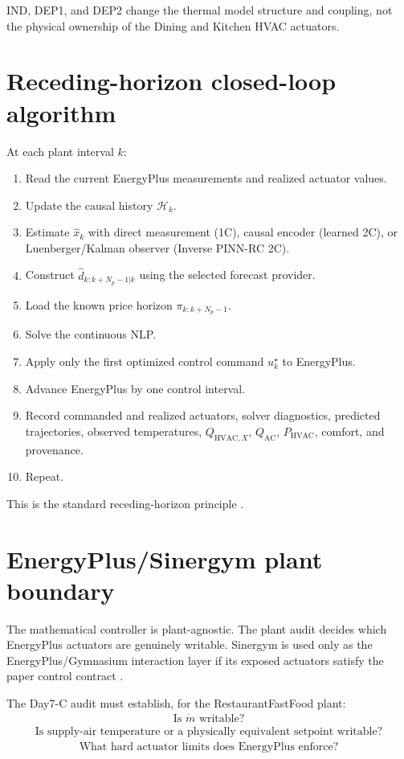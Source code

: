 \documentclass[11pt]{article}
\newcommand{\mdot}{\dot m}
\newcommand{\QAC}{Q_{\mathrm{AC}}}
\newcommand{\PHVAC}{P_{\mathrm{HVAC}}}
\begin{document}
IND, DEP1, and DEP2 change the thermal model structure and coupling, not the physical ownership of
the Dining and Kitchen HVAC actuators.

\section{Receding-horizon closed-loop algorithm}

At each plant interval \(k\):

\begin{enumerate}[leftmargin=2em]
\item Read the current EnergyPlus measurements and realized actuator values.
\item Update the causal history \(\mathcal H_k\).
\item Estimate \(\widehat x_k\) with direct measurement (1C), causal encoder (learned 2C), or
Luenberger/Kalman observer (Inverse PINN-RC 2C).
\item Construct \(\widehat d_{k:k+N_p-1|k}\) using the selected forecast provider.
\item Load the known price horizon \(\pi_{k:k+N_p-1}\).
\item Solve the continuous NLP.
\item Apply only the first optimized control command \(u_k^\star\) to EnergyPlus.
\item Advance EnergyPlus by one control interval.
\item Record commanded and realized actuators, solver diagnostics, predicted trajectories, observed
temperatures, \(Q_{\mathrm{HVAC},X}\), \(\QAC\), \(\PHVAC\), comfort, and provenance.
\item Repeat.
\end{enumerate}

This is the standard receding-horizon principle \citep{garcia1989mpc,rawlings2026mpc}.

\section{EnergyPlus/Sinergym plant boundary}

The mathematical controller is plant-agnostic.  The plant audit decides which EnergyPlus
actuators are genuinely writable.  Sinergym is used only as the EnergyPlus/Gymnasium interaction
layer if its exposed actuators satisfy the paper control contract
\citep{campoy2024sinergym}.

The Day7-C audit must establish, for the RestaurantFastFood plant:
\begin{align}
\boxed{
\text{Is }\mdot\text{ writable?}
}
\end{align}
\begin{align}
\boxed{
\text{Is supply-air temperature or a physically equivalent setpoint writable?}
}
\end{align}
\begin{align}
\boxed{
\text{What hard actuator limits does EnergyPlus enforce?}
}
\end{align}
\end{document}
